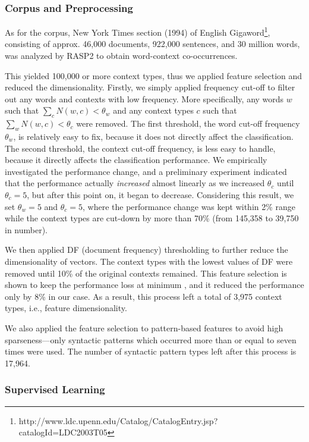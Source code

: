\documentclass[english]{jnlp_1.4}
\begin{document}
\subsubsection{Corpus and Preprocessing}

As for the corpus, New York Times section (1994) of English
Gigaword\footnote{
http://www.ldc.upenn.edu/Catalog/CatalogEntry.jsp?catalogId=LDC2003T05},
consisting of approx. 46,000 documents, 922,000 sentences, and 30
million words, was analyzed by RASP2 to obtain word-context co-occurrences.

This yielded 100,000 or more context types, thus we applied feature
selection and reduced the dimensionality. Firstly, we simply applied
frequency cut-off to filter out any words and contexts with low
frequency. More specifically, any words $w$ such that $\sum_c N(w, c)
< \theta_w$ and any context types $c$ such that $\sum_w N(w, c) <
\theta_c$ were removed. The first threshold, the word cut-off
frequency $\theta_w$, is relatively easy to fix, because it does not
directly affect the classification. The second threshold, the context
cut-off frequency, is less easy to handle, because it directly affects
the classification performance.  We empirically investigated the
performance change, and a preliminary experiment indicated that the
performance actually \textit{increased} almost linearly as we increased
$\theta_c$ until $\theta_c = 5$, but after this point on, it began to
decrease. Considering this result, we set $\theta_w = 5$ and $\theta_c
= 5$, where the performance change was kept within 2\% range while the
context types are cut-down by more than 70\% (from 145,358 to 39,750
in number).


We then applied DF (document frequency) thresholding to further reduce
the dimensionality of vectors. The context types with the lowest
values of DF were removed until 10\% of the original contexts
remained. This feature selection is shown to keep the performance loss
at minimum \cite{Hagiwara:08}, and it reduced the performance only by
8\% in our case. As a result, this process left a total of 3,975
context types, i.e., feature dimensionality.

We also applied the feature selection to pattern-based features to
avoid high sparseness---only syntactic patterns which occurred more
than or equal to seven times were used. The number of syntactic
pattern types left after this process is 17,964.


\subsubsection{Supervised Learning}
\end{document}
